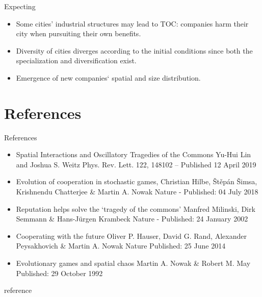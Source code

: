 \documentclass{beamer}
\begin{document}
\begin{frame}{Expecting}
    \begin{itemize}
        \item Some cities' industrial structures may lead to TOC: companies harm their city when pursuiting their own benefits.
        \item Diversity of cities diverges according to the initial conditions since both the specialization and diversification exist.
        \item Emergence of new companies‘ spatial and size distribution.
    \end{itemize}
\end{frame}

\section{References}
\begin{frame}{References}
    \begin{itemize}
        \item Spatial Interactions and Oscillatory Tragedies of the Commons
        Yu-Hui Lin and Joshua S. Weitz
        Phys. Rev. Lett. 122, 148102 – Published 12 April 2019
        \item Evolution of cooperation in stochastic games, Christian Hilbe, Štěpán Šimsa, Krishnendu Chatterjee \& Martin A. Nowak 
        Nature - Published: 04 July 2018
        \item Reputation helps solve the ‘tragedy of the commons’
        Manfred Milinski, Dirk Semmann \& Hans-Jürgen Krambeck Nature - Published: 24 January 2002
        \item Cooperating with the future
        Oliver P. Hauser, David G. Rand, Alexander Peysakhovich \& Martin A. Nowak Nature Published: 25 June 2014
        \item Evolutionary games and spatial chaos
        Martin A. Nowak \& Robert M. May Published: 29 October 1992
    \end{itemize}
\end{frame}
\begin{frame}{reference}
    
\end{frame}
\end{document}
